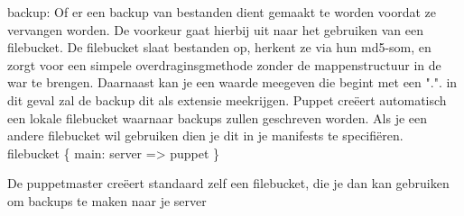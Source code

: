 	backup:
	Of er een backup van bestanden dient gemaakt te worden voordat ze vervangen worden. De voorkeur gaat hierbij uit naar het gebruiken van een filebucket.	De filebucket slaat bestanden op, herkent ze via hun md5-som, en zorgt voor een simpele overdraginsgmethode zonder de mappenstructuur in de war te brengen. Daarnaast kan je een waarde meegeven die begint met een ".". in dit geval zal de backup dit als extensie meekrijgen. Puppet cre\"{e}ert automatisch een lokale filebucket waarnaar backups zullen geschreven worden. Als je een andere filebucket wil gebruiken dien je dit in je manifests te specifi\"{e}ren.\\

	  filebucket \{ main:
	    server => puppet
	  \}

	De puppetmaster cre\"{e}ert standaard zelf een filebucket, die je dan kan gebruiken om backups te maken naar je server
%
%
%
%
%
%

